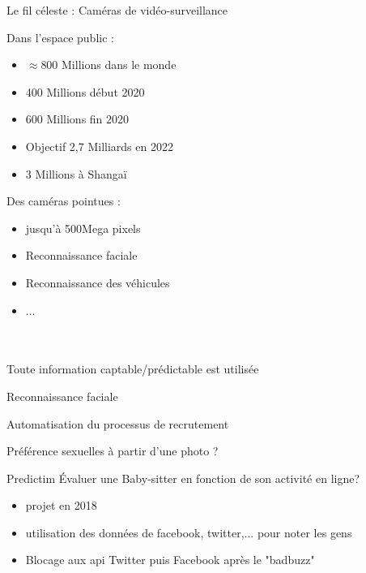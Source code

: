 \begin{frame}{Le fil céleste : Caméras de vidéo-surveillance}
  \begin{minipage}[c]{0.49\linewidth}
    Dans l'espace public :
    \begin{itemize}
      \item $\approx$800 Millions dans le monde
      \item 400 Millions début 2020 
      \item 600 Millions fin 2020 
      \item Objectif 2,7 Milliards en 2022
      \item 3 Millions à Shangaï
      \end{itemize}
    \end{minipage}\hfill
  \begin{minipage}[c]{0.49\linewidth}
    Des caméras pointues :
    \begin{itemize}
      \item jusqu'à 500Mega pixels
      \item Reconnaissance faciale
      \item Reconnaissance des véhicules
      \item ...
    \end{itemize}
  \end{minipage}\hfill\\
  \\
  \newline
  Toute information captable/prédictable est utilisée
\end{frame}

\begin{frame}{Reconnaissance faciale}
\end{frame}

\begin{frame}{Automatisation du processus de recrutement}
\end{frame}

\begin{frame}{Préférence sexuelles à partir d'une photo ?}
\end{frame}

\begin{frame}{Predictim}
  Évaluer une Baby-sitter en fonction de son activité en ligne?
  \begin{itemize}
    \item projet en 2018
    \item utilisation des données de facebook, twitter,... pour noter les gens
    \item Blocage aux api Twitter puis Facebook après le "badbuzz"
  \end{itemize}
\end{frame}

